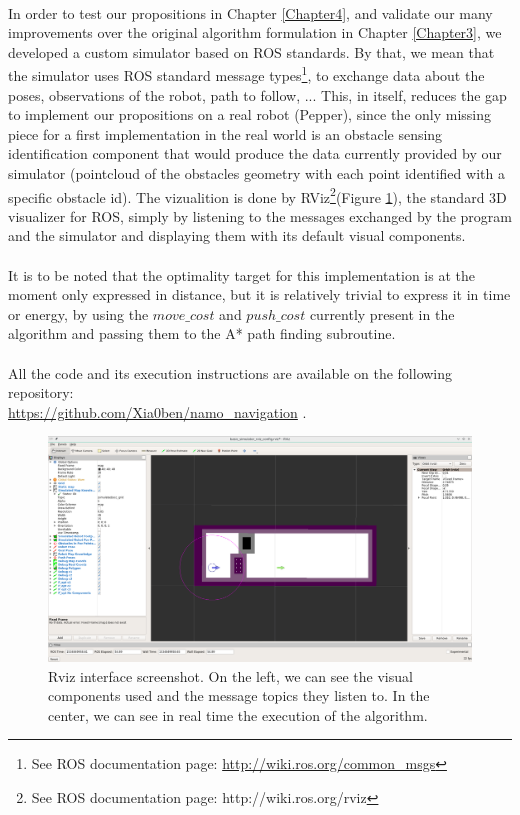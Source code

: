 \paragraph{} In order to test our propositions in Chapter \ref{Chapter4}, and validate our many improvements over the original algorithm formulation in Chapter \ref{Chapter3}, we developed a custom simulator based on ROS standards. By that, we mean that the simulator uses ROS standard message types\footnote{See ROS documentation page: \url{http://wiki.ros.org/common_msgs}}, to exchange data about the poses, observations of the robot, path to follow, ... This, in itself, reduces the gap to implement our propositions on a real robot (Pepper), since the only missing piece for a first implementation in the real world is an obstacle sensing identification component that would produce the data currently provided by our simulator (pointcloud of the obstacles geometry with each point identified with a specific obstacle id). The vizualition is done by RViz\footnote{See ROS documentation page: http://wiki.ros.org/rviz}(Figure \ref{fig:rviz}), the standard 3D visualizer for ROS, simply by listening to the messages exchanged by the program and the simulator and displaying them with its default visual components.

\paragraph{} It is to be noted that the optimality target for this implementation is at the moment only expressed in distance, but it is relatively trivial to express it in time or energy, by using the $move\_cost$ and $push\_cost$ currently present in the algorithm and passing them to the A* path finding subroutine.

\paragraph{} All the code and its execution instructions are available on the following repository: \\ \url{https://github.com/Xia0ben/namo_navigation} .

\begin{figure}[H]
\centering
\includegraphics[width=14cm]{Figures/Simulation/rviz.png}
\caption{Rviz interface screenshot. On the left, we can see the visual components used and the message topics they listen to. In the center, we can see in real time the execution of the algorithm.}
\label{fig:rviz}
\end{figure}

